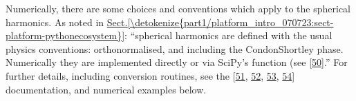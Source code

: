 \documentclass[letterpaper,table,10pt,english]{jupyterBook}
\begin{document}
\sphinxAtStartPar
Numerically, there are some choices and conventions which apply to the spherical harmonics. As noted in \hyperref[\detokenize{part1/platform_intro_070723:sect-platform-pythonecosystem}]{Sect.\@ \ref{\detokenize{part1/platform_intro_070723:sect-platform-pythonecosystem}}}: “spherical harmonics are defined with the usual physics conventions: orthonormalised, and including the Condon\sphinxhyphen{}Shortley phase. Numerically they are implemented directly or via SciPy’s  function (see  {[}\hyperlink{cite.backmatter/bibliography:id857}{50}{]}.” For further details, including conversion routines, see the  {[}\hyperlink{cite.backmatter/bibliography:id868}{51}, \hyperlink{cite.backmatter/bibliography:id936}{52}, \hyperlink{cite.backmatter/bibliography:id937}{53}, \hyperlink{cite.backmatter/bibliography:id938}{54}{]} documentation, and numerical examples below.
\end{document}
